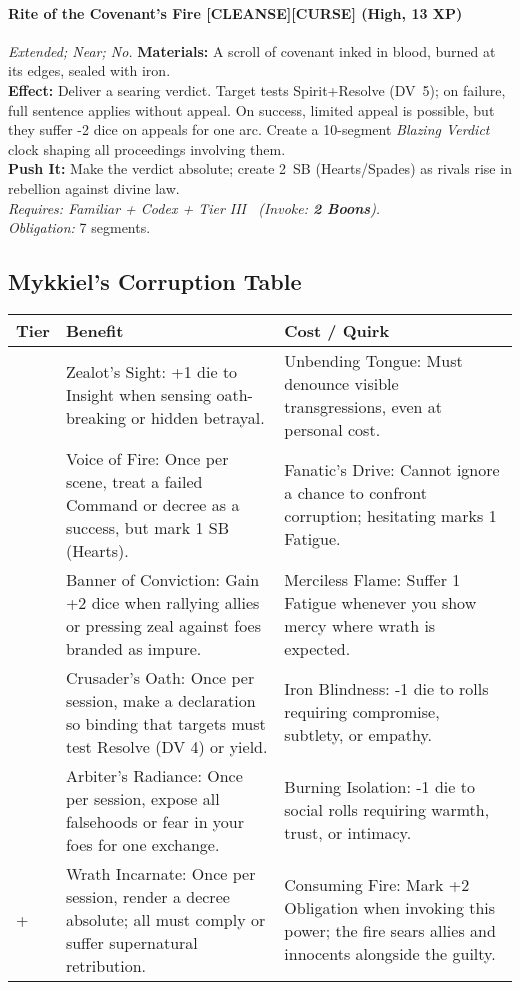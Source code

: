 \paragraph{Rite of the Covenant’s Fire \textnormal{[CLEANSE][CURSE]} (High, 13 XP)} \emph{Extended; Near; No.}
\textbf{Materials:} A scroll of covenant inked in blood, burned at its edges, sealed with iron.\\
\textbf{Effect:} Deliver a searing verdict. Target tests Spirit+Resolve (DV~5); on failure, full sentence applies without appeal. On success, limited appeal is possible, but they suffer -2 dice on appeals for one arc. Create a 10-segment \emph{Blazing Verdict} clock shaping all proceedings involving them.\\
\textbf{Push It:} Make the verdict absolute; create 2~SB (Hearts/Spades) as rivals rise in rebellion against divine law.\\
\emph{Requires: Familiar + Codex + Tier III \ (\textit{Invoke:} \textbf{2 Boons}).}\\
\emph{Obligation:} 7 segments.

\subsection*{Mykkiel's Corruption Table}
\label{sec:mykkiel-corruption}

\begin{longtable}{>{\raggedright\arraybackslash}p{1cm} p{5cm} p{5cm}}
\toprule
\textbf{Tier} & \textbf{Benefit} & \textbf{Cost / Quirk} \\
\midrule
1 & Zealot’s Sight: +1 die to Insight when sensing oath-breaking or hidden betrayal. & Unbending Tongue: Must denounce visible transgressions, even at personal cost. \\
\midrule
2 & Voice of Fire: Once per scene, treat a failed Command or decree as a success, but mark 1 SB (Hearts). & Fanatic’s Drive: Cannot ignore a chance to confront corruption; hesitating marks 1 Fatigue. \\
\midrule
3 & Banner of Conviction: Gain +2 dice when rallying allies or pressing zeal against foes branded as impure. & Merciless Flame: Suffer 1 Fatigue whenever you show mercy where wrath is expected. \\
\midrule
4 & Crusader’s Oath: Once per session, make a declaration so binding that targets must test Resolve (DV 4) or yield. & Iron Blindness: -1 die to rolls requiring compromise, subtlety, or empathy. \\
\midrule
5 & Arbiter’s Radiance: Once per session, expose all falsehoods or fear in your foes for one exchange. & Burning Isolation: -1 die to social rolls requiring warmth, trust, or intimacy. \\
\midrule
6+ & Wrath Incarnate: Once per session, render a decree absolute; all must comply or suffer supernatural retribution. & Consuming Fire: Mark +2 Obligation when invoking this power; the fire sears allies and innocents alongside the guilty. \\
\bottomrule
\end{longtable}